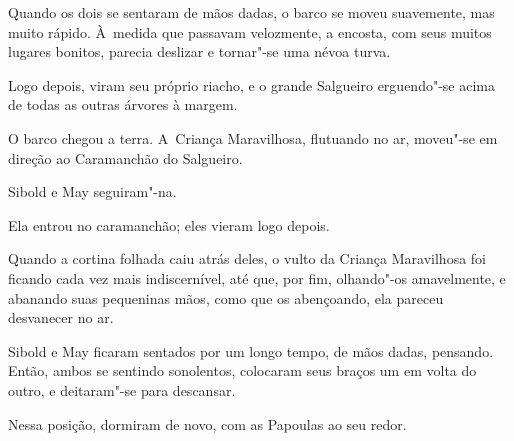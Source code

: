 Quando os dois se sentaram de mãos dadas, o barco se moveu suavemente,
mas muito rápido. À~medida que passavam velozmente, a encosta, com seus
muitos lugares bonitos, parecia deslizar e tornar"-se uma névoa turva.

Logo depois, viram seu próprio riacho, e o grande Salgueiro
erguendo"-se acima de todas as outras árvores à margem.

O barco chegou a terra. A~Criança Maravilhosa, flutuando no ar, moveu"-se
em direção ao Caramanchão do Salgueiro.

Sibold e May seguiram"-na.

Ela entrou no caramanchão; eles vieram logo depois.

Quando a cortina folhada caiu atrás deles, o vulto da Criança
Maravilhosa foi ficando cada vez mais indiscernível, até que, por fim,
olhando"-os amavelmente, e abanando suas pequeninas mãos, como que os
abençoando, ela pareceu desvanecer no ar.

\smallskip

Sibold e May ficaram sentados por um longo tempo, de mãos dadas,
pensando. Então, ambos se sentindo sonolentos, colocaram seus braços um
em volta do outro, e deitaram"-se para descansar.

\smallskip

Nessa posição, dormiram de novo, com as Papoulas ao seu redor.
